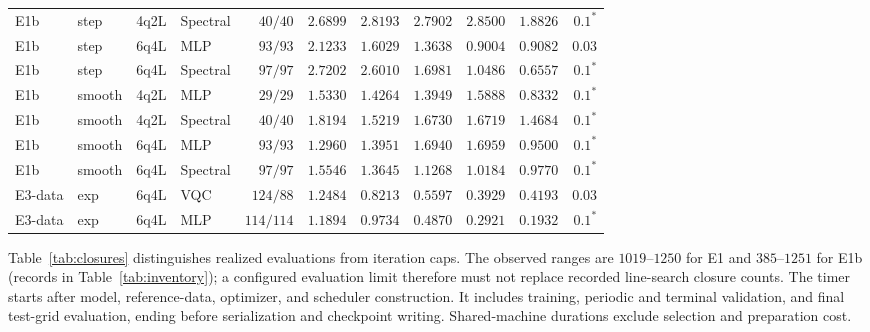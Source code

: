 \documentclass[11pt]{article}
\begin{document}
\begin{longtable}{llllrrrrrrr}
E1b & step & 4q2L & Spectral & $40/40$ & $2.6899$ & $2.8193$ & $2.7902$ & $2.8500$ & $1.8826$ & $0.1^{\ast}$ \\
E1b & step & 6q4L & MLP & $93/93$ & $2.1233$ & $1.6029$ & $1.3638$ & $0.9004$ & $0.9082$ & $0.03$ \\
E1b & step & 6q4L & Spectral & $97/97$ & $2.7202$ & $2.6010$ & $1.6981$ & $1.0486$ & $0.6557$ & $0.1^{\ast}$ \\
E1b & smooth & 4q2L & MLP & $29/29$ & $1.5330$ & $1.4264$ & $1.3949$ & $1.5888$ & $0.8332$ & $0.1^{\ast}$ \\
E1b & smooth & 4q2L & Spectral & $40/40$ & $1.8194$ & $1.5219$ & $1.6730$ & $1.6719$ & $1.4684$ & $0.1^{\ast}$ \\
E1b & smooth & 6q4L & MLP & $93/93$ & $1.2960$ & $1.3951$ & $1.6940$ & $1.6959$ & $0.9500$ & $0.1^{\ast}$ \\
E1b & smooth & 6q4L & Spectral & $97/97$ & $1.5546$ & $1.3645$ & $1.1268$ & $1.0184$ & $0.9770$ & $0.1^{\ast}$ \\
\midrule
E3-data & exp & 6q4L & VQC & $124/88$ & $1.2484$ & $0.8213$ & $0.5597$ & $0.3929$ & $0.4193$ & $0.03$ \\
E3-data & exp & 6q4L & MLP & $114/114$ & $1.1894$ & $0.9734$ & $0.4870$ & $0.2921$ & $0.1932$ & $0.1^{\ast}$ \\
\end{longtable}
\endgroup

Table~\ref{tab:closures} distinguishes realized evaluations from iteration
caps. The observed ranges are $1019$--$1250$ for E1 and $385$--$1251$
for E1b (records in Table~\ref{tab:inventory}); a configured evaluation
limit therefore must not replace recorded line-search closure counts.
The timer starts after model, reference-data, optimizer, and scheduler
construction. It includes training, periodic and terminal validation,
and final test-grid evaluation, ending before serialization and checkpoint
writing. Shared-machine durations exclude selection and preparation cost.
\end{document}
